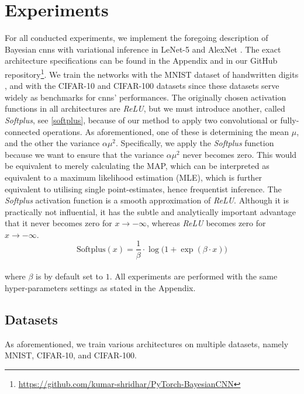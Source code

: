 \section{Experiments} \label{experiments}
For all conducted experiments, we implement the foregoing description of Bayesian \acp{cnn} with variational inference in LeNet-5 \cite{lecun1998gradient} and AlexNet \cite{krizhevsky2012imagenet}. The exact architecture specifications can be found in the Appendix and in our GitHub repository\footnote{\url{https://github.com/kumar-shridhar/PyTorch-BayesianCNN}}.
We train the networks with the MNIST dataset of handwritten digits \cite{lecun1998gradient}, and with the CIFAR-10 and CIFAR-100 datasets \cite{krizhevsky2009learning} since these datasets serve widely as benchmarks for \acp{cnn}' performances. The originally chosen activation functions in all architectures are \textit{ReLU}, but we must introduce another, called \textit{Softplus}, see \eqref{softplus}, because of our method to apply two convolutional or fully-connected operations. As aforementioned, one of these is determining the mean $\mu$, and the other the variance $\alpha \mu^2$. Specifically, we apply the \textit{Softplus} function because we want to ensure that the variance $\alpha \mu^2$ never becomes zero. This would be equivalent to merely calculating the MAP, which can be interpreted as equivalent to a maximum likelihood estimation (MLE), which is further equivalent to utilising single point-estimates, hence frequentist inference. The \textit{Softplus} activation function is a smooth approximation of \textit{ReLU}. Although it is practically not influential, it has the subtle and analytically important advantage that it never becomes zero for $x \rightarrow -\infty$, whereas \textit{ReLU} becomes zero for $x \rightarrow -\infty$.
\\ 
\begin{equation}\label{softplus}
     \text{Softplus}(x) = \frac{1}{\beta} \cdot \log \big ( 1 + \exp(\beta \cdot x) \big )
\end{equation}
\\
where $\beta$ is by default set to $1$.
\newline All experiments are performed with the same hyper-parameters settings as stated in the Appendix.

\subsection{Datasets}
As aforementioned, we train various architectures on multiple datasets, namely MNIST, CIFAR-10, and CIFAR-100. 
\newline
